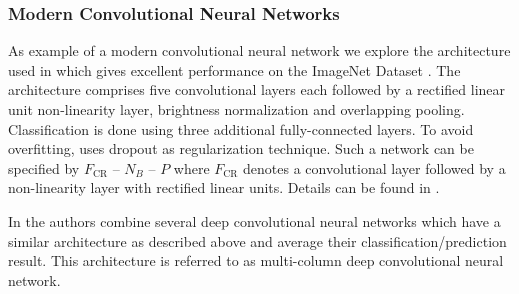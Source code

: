 \subsubsection{Modern Convolutional Neural Networks}
\label{subsubsec:modern-convolutional-networks}

As example of a modern convolutional neural network we explore the architecture used in \cite{KrizhevskySutskeverHinton:2012} which gives excellent performance on the ImageNet Dataset \cite{ZeilerFergus:2013}. The architecture comprises five convolutional layers each followed by a rectified linear unit non-linearity layer, brightness normalization and overlapping pooling. Classification is done using three additional fully-connected layers. To avoid overfitting, \cite{KrizhevskySutskeverHinton:2012} uses dropout as regularization technique. Such a network can be specified by $F_{\text{CR}}$ -- $N_B$ -- $P$ where $F_{\text{CR}}$ denotes a convolutional layer followed by a non-linearity layer with rectified linear units. Details can be found in \cite{KrizhevskySutskeverHinton:2012}. 

In \cite{CiresanMeierSchmidhuber:2012} the authors combine several deep convolutional neural networks which have a similar architecture as described above and average their classification/prediction result. This architecture is referred to as multi-column deep convolutional neural network.


